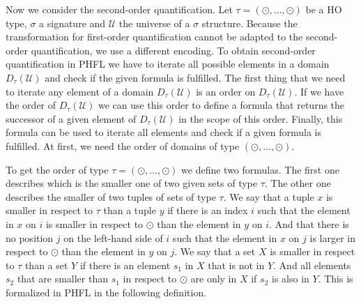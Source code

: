 Now we consider the second-order quantification. Let $\tau = (\odot, \dots, \odot)$ be a HO type, $\sigma$ a signature and
$\mathcal{U}$ the universe of a $\sigma$ structure. Because the transformation for first-order quantification cannot be adapted to the second-order quantification, we use a different encoding. To obtain second-order
quantification in PHFL we have to iterate all possible elements in a domain $D_\tau(\mathcal{U})$ and
check if the given formula is fulfilled. The first thing that we need to iterate any element of a domain
$D_\tau(\mathcal{U})$ is an order on $D_\tau(\mathcal{U})$. If we have the order of $D_\tau(\mathcal{U})$ we can use
this order to define a formula that returns the successor of a given element of $D_\tau(\mathcal{U})$ in the scope
of this order. Finally, this formula can be used to iterate all elements and check if a given formula is
fulfilled.
At first, we need the order of domains of type $(\odot, \dots, \odot)$.

To get the order of type $\tau = (\odot, \dots, \odot)$ we define two formulas. The first one describes which is the smaller one of two given sets of type $\tau$. The other one describes the smaller of two tuples of sets of type $\tau$. We say that a tuple $x$ is smaller in respect to $
\tau$ than a tuple $y$ if there is an index $i$ such that the element in $x$ on $i$ is smaller in 
respect to $\odot$ than the element in $y$ on $i$. And that there is no position $j$ on the left-hand side of $i$ such 
that the element in $x$ on $j$ is larger in respect to $\odot$ than the element in $y$ on $j$. 
We say that a set $X$ is smaller in respect to $\tau$ than a set $Y$ if there is an element 
$s_1$ in $X$ that is not in $Y$. And all elements $s_2$ that are smaller than $s_1$ in respect to $\odot$ 
are only in $X$ if $s_2$ is also in $Y$. This is formalized in PHFL in the following definition.

